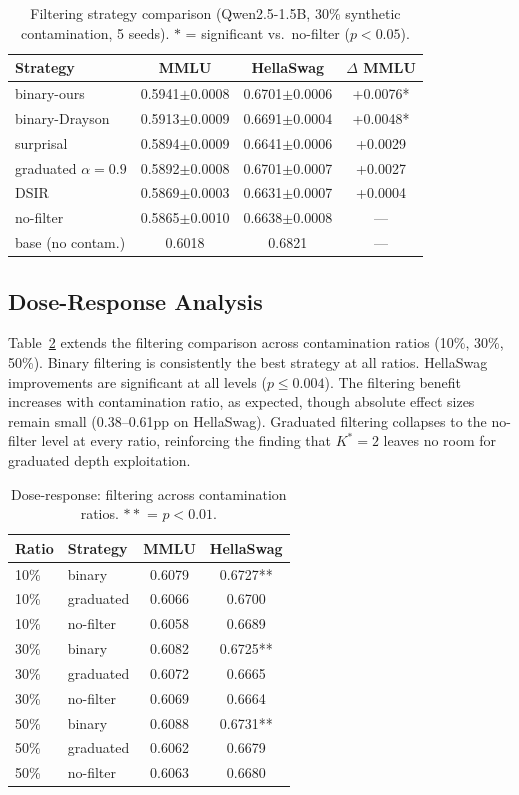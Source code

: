 \documentclass[11pt]{article}
\begin{document}
\begin{table}[t]
\centering
\caption{Filtering strategy comparison (Qwen2.5-1.5B, 30\% synthetic contamination, 5 seeds). $*$ = significant vs.\ no-filter ($p < 0.05$).}
\label{tab:filtering}
\small
\begin{tabular}{lccc}
\toprule
Strategy & MMLU & HellaSwag & $\Delta$ MMLU \\
\midrule
binary-ours & 0.5941$\pm$0.0008 & 0.6701$\pm$0.0006 & +0.0076* \\
binary-Drayson & 0.5913$\pm$0.0009 & 0.6691$\pm$0.0004 & +0.0048* \\
surprisal & 0.5894$\pm$0.0009 & 0.6641$\pm$0.0006 & +0.0029 \\
graduated $\alpha{=}0.9$ & 0.5892$\pm$0.0008 & 0.6701$\pm$0.0007 & +0.0027 \\
DSIR & 0.5869$\pm$0.0003 & 0.6631$\pm$0.0007 & +0.0004 \\
no-filter & 0.5865$\pm$0.0010 & 0.6638$\pm$0.0008 & --- \\
\midrule
base (no contam.) & 0.6018 & 0.6821 & --- \\
\bottomrule
\end{tabular}
\end{table}

\subsection{Dose-Response Analysis}

Table~\ref{tab:dose} extends the filtering comparison across contamination ratios (10\%, 30\%, 50\%). Binary filtering is consistently the best strategy at all ratios. HellaSwag improvements are significant at all levels ($p \leq 0.004$). The filtering benefit increases with contamination ratio, as expected, though absolute effect sizes remain small (0.38--0.61pp on HellaSwag). Graduated filtering collapses to the no-filter level at every ratio, reinforcing the finding that $K^* = 2$ leaves no room for graduated depth exploitation.

\begin{table}[t]
\centering
\caption{Dose-response: filtering across contamination ratios. $**$ = $p < 0.01$.}
\label{tab:dose}
\small
\begin{tabular}{llcc}
\toprule
Ratio & Strategy & MMLU & HellaSwag \\
\midrule
10\% & binary & 0.6079 & 0.6727** \\
10\% & graduated & 0.6066 & 0.6700 \\
10\% & no-filter & 0.6058 & 0.6689 \\
\midrule
30\% & binary & 0.6082 & 0.6725** \\
30\% & graduated & 0.6072 & 0.6665 \\
30\% & no-filter & 0.6069 & 0.6664 \\
\midrule
50\% & binary & 0.6088 & 0.6731** \\
50\% & graduated & 0.6062 & 0.6679 \\
50\% & no-filter & 0.6063 & 0.6680 \\
\bottomrule
\end{tabular}
\end{table}
\end{document}
